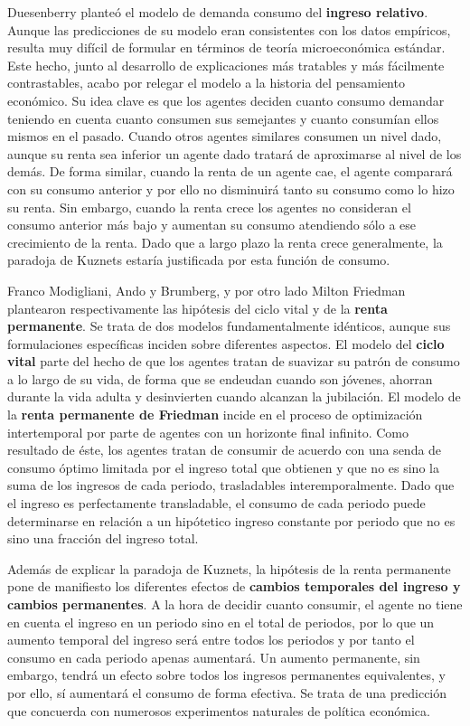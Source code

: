 \documentclass{nuevotema}
\begin{document}
Duesenberry planteó el modelo de demanda consumo del \textbf{ingreso relativo}. Aunque las predicciones de su modelo eran consistentes con los datos empíricos, resulta muy difícil de formular en términos de teoría microeconómica estándar. Este hecho, junto al desarrollo de explicaciones más tratables y más fácilmente contrastables, acabo por relegar el modelo a la historia del pensamiento económico. Su idea clave es que los agentes deciden cuanto consumo demandar teniendo en cuenta cuanto consumen sus semejantes y cuanto consumían ellos mismos en el pasado. Cuando otros agentes similares consumen un nivel dado, aunque su renta sea inferior un agente dado tratará de aproximarse al nivel de los demás. De forma similar, cuando la renta de un agente cae, el agente comparará con su consumo anterior y por ello no disminuirá tanto su consumo como lo hizo su renta. Sin embargo, cuando la renta crece los agentes no consideran el consumo anterior más bajo y aumentan su consumo atendiendo sólo a ese crecimiento de la renta. Dado que a largo plazo la renta crece generalmente, la paradoja de Kuznets estaría justificada por esta función de consumo.

Franco Modigliani, Ando y Brumberg, y por otro lado Milton Friedman plantearon respectivamente las hipótesis del ciclo vital y de la \textbf{renta permanente}. Se trata de dos modelos fundamentalmente idénticos, aunque sus formulaciones específicas inciden sobre diferentes aspectos. El modelo del \textbf{ciclo vital} parte del hecho de que los agentes tratan de suavizar su patrón de consumo a lo largo de su vida, de forma que se endeudan cuando son jóvenes, ahorran durante la vida adulta y desinvierten cuando alcanzan la jubilación. El modelo de la \textbf{renta permanente de Friedman} incide en el proceso de optimización intertemporal por parte de agentes con un horizonte final infinito. Como resultado de éste, los agentes tratan de consumir de acuerdo con una senda de consumo óptimo limitada por el ingreso total que obtienen y que no es sino la suma de los ingresos de cada periodo, trasladables interemporalmente. Dado que el ingreso es perfectamente transladable, el consumo de cada periodo puede determinarse en relación a un hipótetico ingreso constante por periodo que no es sino una fracción del ingreso total.

Además de explicar la paradoja de Kuznets, la hipótesis de la renta permanente pone de manifiesto los diferentes efectos de \textbf{cambios temporales del ingreso y cambios permanentes}. A la hora de decidir cuanto consumir, el agente no tiene en cuenta el ingreso en un periodo sino en el total de periodos, por lo que un aumento temporal del ingreso será  entre todos los periodos y por tanto el consumo en cada periodo apenas aumentará. Un aumento permanente, sin embargo, tendrá un efecto sobre todos los ingresos permanentes equivalentes, y por ello, sí aumentará el consumo de forma efectiva. Se trata de una predicción que concuerda con numerosos experimentos naturales de política económica.
\end{document}

